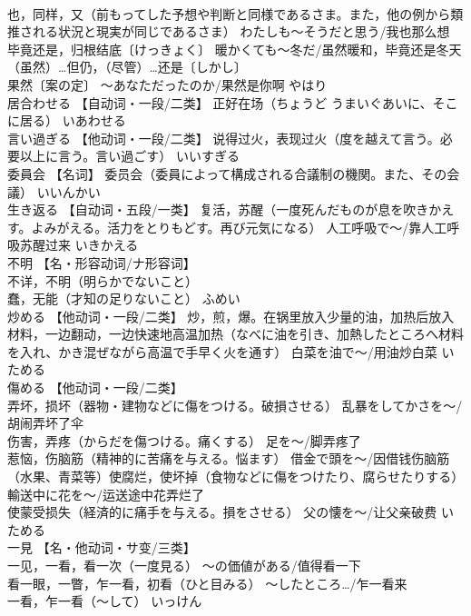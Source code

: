 \documentclass[8pt]{extreport}
\begin{document}
\begin{CJK}{UTF8}{min}
\\	也，同样，又（前もってした予想や判断と同様であるさま。また，他の例から類推される状況と現実が同じであるさま） わたしも～そうだと思う/我也那么想 
\\	毕竟还是，归根结底〔けっきょく〕 暖かくても～冬だ/虽然暖和，毕竟还是冬天 
\\	（虽然）…但仍，（尽管）…还是〔しかし〕 
\\	果然〔案の定〕 ～あなただったのか/果然是你啊	やはり	
\\	居合わせる	【自动词・一段/二类】 正好在场（ちょうど うまいぐあいに、そこに居る）	いあわせる	
\\	言い過ぎる	【他动词・一段/二类】 说得过火，表现过火（度を越えて言う。必要以上に言う。言い過ごす）	いいすぎる	
\\	委員会	【名词】 委员会（委員によって構成される合議制の機関。また、その会議）	いいんかい	
\\	生き返る	【自动词・五段/一类】 复活，苏醒（一度死んだものが息を吹きかえす。よみがえる。活力をとりもどす。再び元気になる） 人工呼吸で～/靠人工呼吸苏醒过来	いきかえる	
\\	不明	【名・形容动词/ナ形容词】 
\\	不详，不明（明らかでないこと） 
\\	蠢，无能（才知の足りないこと）	ふめい	
\\	炒める	【他动词・一段/二类】 炒，煎，爆。在锅里放入少量的油，加热后放入材料，一边翻动，一边快速地高温加热（なべに油を引き、加熱したところへ材料を入れ、かき混ぜながら高温で手早く火を通す） 白菜を油で～/用油炒白菜	いためる	
\\	傷める	【他动词・一段/二类】 
\\	弄坏，损坏（器物・建物などに傷をつける。破損させる） 乱暴をしてかさを～/胡闹弄坏了伞 
\\	伤害，弄疼（からだを傷つける。痛くする） 足を～/脚弄疼了 
\\	惹恼，伤脑筋（精神的に苦痛を与える。悩ます） 借金で頭を～/因借钱伤脑筋 
\\	（水果、青菜等）使腐烂，使坏掉（食物などに傷をつけたり、腐らせたりする） 輸送中に花を～/运送途中花弄烂了 
\\	使蒙受损失（経済的に痛手を与える。損をさせる） 父の懐を～/让父亲破费	いためる	
\\	一見	【名・他动词・サ变/三类】 
\\	一见，一看，看一次（一度見る） ～の価値がある/值得看一下 
\\	看一眼，一瞥，乍一看，初看（ひと目みる） ～したところ…/乍一看来 
\\	一看，乍一看（～して）	いっけん	

\end{CJK}
\end{document}
